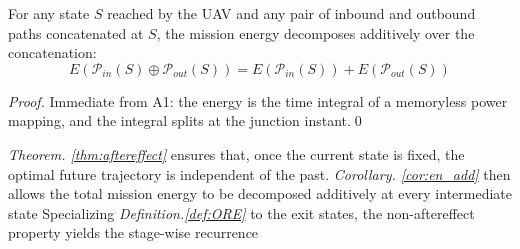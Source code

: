 \begin{corollary}\label{cor:en_add}
    For any state $S$ reached by the UAV and any pair of inbound and outbound paths concatenated at $S$, the mission energy decomposes additively over the concatenation:
    \[ E(\mathcal{P}_{in}(S)\oplus \mathcal{P}_{out}(S))  = E(\mathcal{P}_{in}(S)) + E(\mathcal{P}_{out}(S)) \]
\end{corollary}

\begin{proof}
    Immediate from A1: the energy is the time integral of a memoryless power mapping, and the integral splits at the junction instant.\qed
\end{proof}

\textit{Theorem. \ref{thm:aftereffect}} ensures that, once the current state is fixed, the optimal future trajectory is independent of the past.
\textit{Corollary. \ref{cor:en_add}} then allows the total mission energy to be decomposed additively at every intermediate state Specializing \textit{Definition.\ref{def:ORE}} to the exit states, the non-aftereffect property yields the stage-wise recurrence

